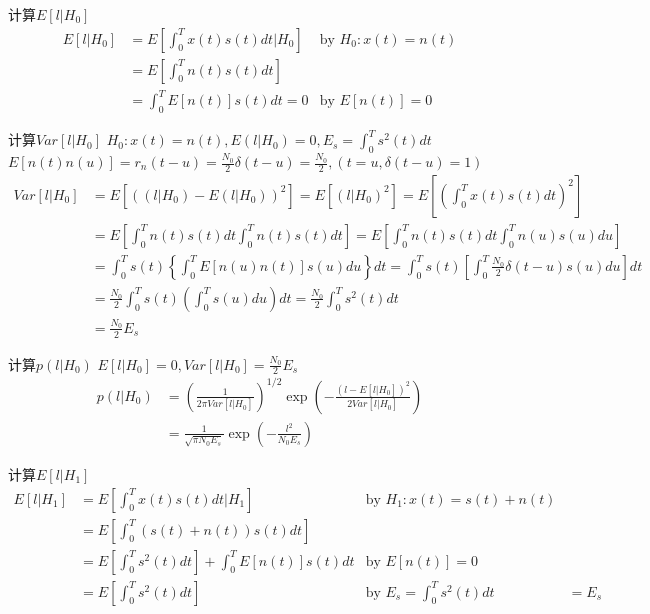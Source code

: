 \begin{frame}{计算$E[l|H_0]$}
\begin{align*}
E[l|H_0]&=E\left[\int_{0}^{T}x(t)s(t)dt|H_0\right] &\text{by }H_0: x(t)=n(t)\\
&=E\left[\int_{0}^{T}n(t)s(t)dt\right]&\\
&=\int_{0}^{T}E[n(t)]s(t)dt=0 &\text{by }E[n(t)]=0
\end{align*}
\end{frame}

\begin{frame}{计算$Var[l|H_0]$}
$H_0:x(t)=n(t), E(l|H_0)=0,E_s=\int_{0}^{T}s^2(t)dt$\\
$E[n(t)n(u)]=r_n(t-u)=\frac{N_0}{2}\delta(t-u)=\frac{N_0}{2},(t=u,\delta(t-u)=1)$
\begin{align*}
Var[l|H_0]&=E[((l|H_0)-E(l|H_0))^2]=E[(l|H_0)^2]=E\left[\left(\int_{0}^{T}x(t)s(t)dt\right)^2\right]\\
&=E\left[\int_{0}^{T}n(t)s(t)dt\int_{0}^{T}n(t)s(t)dt\right]=E\left[\int_{0}^{T}n(t)s(t)dt\int_{0}^{T}n(u)s(u)du\right]\\
&=\int_{0}^{T}s(t)\left\{\int_{0}^{T}E[n(u)n(t)]s(u)du\right\}dt=\int_{0}^{T}s(t)\left[\int_{0}^{T}\frac{N_0}{2}\delta(t-u)s(u)du\right]dt\\
&=\frac{N_0}{2}\int_{0}^{T}s(t)\left(\int_{0}^{T}s(u)du\right)dt=\frac{N_0}{2}\int_{0}^{T}s^2(t)dt\\
&=\frac{N_0}{2}E_s
\end{align*}
\end{frame}

\begin{frame}{计算$p(l|H_0)$}
$E[l|H_0]=0,Var[l|H_0]=\frac{N_0}{2}E_s$
\begin{align*}
p(l|H_0)&=\left(\frac{1}{2\pi Var[l|H_0]}\right)^{1/2}\exp\left(-\frac{(l-E[l|H_0])^2}{2Var[l|H_0]}\right)\\
&=\frac{1}{\sqrt{\pi N_0E_s}}\exp\left(-\frac{l^2}{N_0E_s}\right)
\end{align*}
\end{frame}

\begin{frame}{计算$E[l|H_1]$}
\begin{align*}
E[l|H_1]&=E\left[\int_{0}^{T}x(t)s(t)dt|H_1\right] &\text{by }H_1: x(t)=s(t)+n(t)\\
&=E\left[\int_{0}^{T}(s(t)+n(t))s(t)dt\right]&\\
&=E\left[\int_{0}^{T}s^2(t)dt\right]+\int_{0}^{T}E[n(t)]s(t)dt& \text{by } E[n(t)]=0 \\
&=E\left[\int_{0}^{T}s^2(t)dt\right]& \text{by } E_s=\int_{0}^{T}s^2(t)dt 
&=E_s
\end{align*}
\end{frame}

